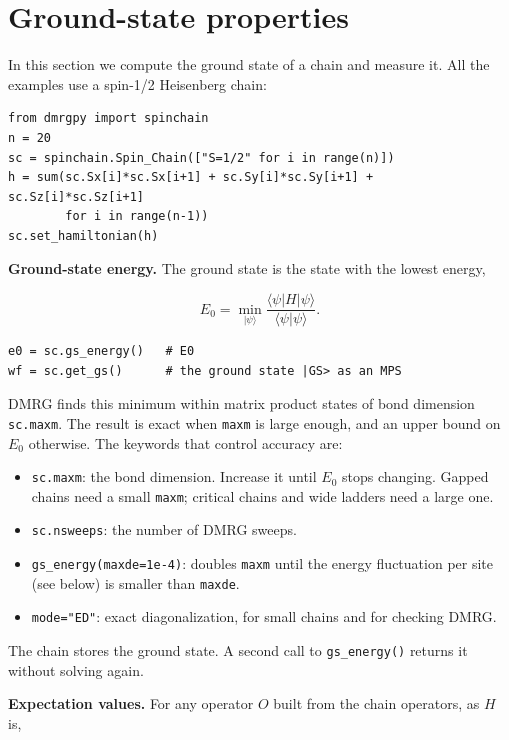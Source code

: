 \documentclass[11pt]{article}
\providecommand{\tightlist}{\setlength{\itemsep}{0pt}\setlength{\parskip}{0pt}}
\begin{document}
\section{Ground-state properties}

In this section we compute the ground state of a chain and measure it. All
the examples use a spin-1/2 Heisenberg chain:

\begin{lstlisting}
from dmrgpy import spinchain
n = 20
sc = spinchain.Spin_Chain(["S=1/2" for i in range(n)])
h = sum(sc.Sx[i]*sc.Sx[i+1] + sc.Sy[i]*sc.Sy[i+1] + sc.Sz[i]*sc.Sz[i+1]
        for i in range(n-1))
sc.set_hamiltonian(h)
\end{lstlisting}

\textbf{Ground-state energy.} The ground state is the state with the lowest
energy,

\[E_0=\min_{|\psi\rangle}\frac{\langle\psi|H|\psi\rangle}{\langle\psi|\psi\rangle}.\]

\begin{lstlisting}
e0 = sc.gs_energy()   # E0
wf = sc.get_gs()      # the ground state |GS> as an MPS
\end{lstlisting}

DMRG finds this minimum within matrix product states of bond dimension
\texttt{sc.\allowbreak{}maxm}. The result is exact when \texttt{maxm} is large enough, and an upper
bound on \(E_0\) otherwise. The keywords that control accuracy are:

\begin{itemize}
\tightlist
\item
  \texttt{sc.\allowbreak{}maxm}: the bond dimension. Increase it until \(E_0\) stops changing.
  Gapped chains need a small \texttt{maxm}; critical chains and wide ladders need
  a large one.
\item
  \texttt{sc.\allowbreak{}nsweeps}: the number of DMRG sweeps.
\item
  \texttt{gs\_\allowbreak{}energy(maxde=1e-4)}: doubles \texttt{maxm} until the energy fluctuation per
  site (see below) is smaller than \texttt{maxde}.
\item
  \texttt{mode="ED"}: exact diagonalization, for small chains and for checking
  DMRG.
\end{itemize}

The chain stores the ground state. A second call to \texttt{gs\_\allowbreak{}energy()} returns
it without solving again.

\textbf{Expectation values.} For any operator \(O\) built from the chain
operators, as \(H\) is,
\end{document}
